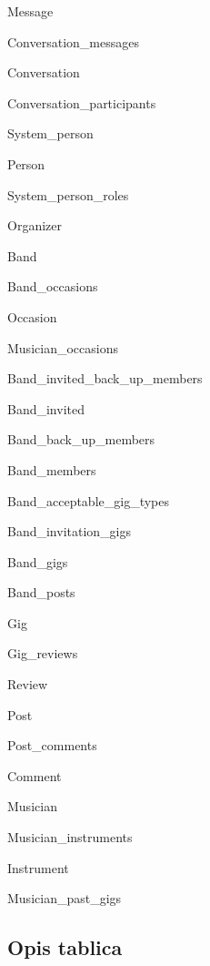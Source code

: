 		\begin{packed_item}
		\item Message
		\item Conversation\_messages
		\item Conversation
		\item Conversation\_participants
		\item System\_person
		\item Person
		\item System\_person\_roles
		\item Organizer
		\item Band 
		\item Band\_occasions
		\item Occasion
		\item Musician\_occasions
		\item Band\_invited\_back\_up\_members
		\item Band\_invited 
		\item Band\_back\_up\_members
		\item Band\_members
		\item Band\_acceptable\_gig\_types
		\item Band\_invitation\_gigs
		\item Band\_gigs
		\item Band\_posts	
		\item Gig
		\item Gig\_reviews
		\item Review
		\item Post
		\item Post\_comments
		\item Comment
		\item Musician
		\item Musician\_instruments
		\item Instrument
		\item Musician\_past\_gigs
		
		
	\end{packed_item}
	
	
	\subsection{Opis tablica}
	
